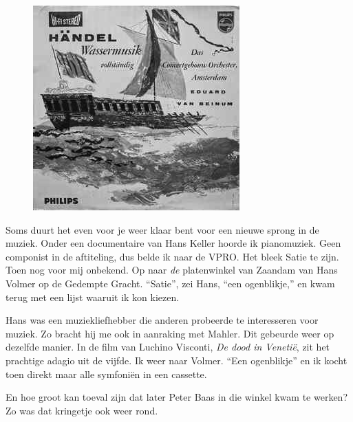 \documentclass[10pt,twoside, openright]{memoir}
\begin{document}
\begin{figure}
\includegraphics[width=\textwidth]{img/96watermusic}
\end{figure}

Soms duurt het even voor je weer klaar bent voor een nieuwe sprong in de muziek. Onder een documentaire van Hans Keller hoorde ik pianomuziek. Geen componist in de aftiteling, dus belde ik naar de VPRO. Het bleek Satie te zijn. Toen nog voor mij onbekend. Op naar \emph{de} platenwinkel van Zaandam van Hans Volmer op de Gedempte Gracht. ``Satie'', zei Hans, ``een ogenblikje,'' en kwam terug met een lijst waaruit ik kon kiezen. 

Hans was een muziekliefhebber die anderen probeerde te interesseren voor muziek. Zo bracht hij me ook in aanraking met Mahler. Dit gebeurde weer op dezelfde manier. In de film van Luchino Visconti, \emph{De dood in Venetië}, zit het prachtige adagio uit de vijfde. Ik weer naar Volmer. ``Een ogenblikje'' en ik kocht toen direkt maar alle symfoniën in een cassette.

En hoe groot kan toeval zijn dat later Peter Baas in die winkel kwam te werken? Zo was dat kringetje ook weer rond. 
\end{document}
